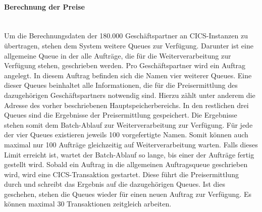 \paragraph{Berechnung der Preise}~\\
Um die Berechnungsdaten der 180.000 Geschäftspartner an CICS-Instanzen zu übertragen, stehen dem System weitere Queues zur Verfügung.
Darunter ist eine allgemeine Queue in der alle Aufträge, die für die Weiterverarbeitung zur Verfügung stehen, geschrieben werden.
Pro Geschäftspartner wird ein Auftrag angelegt.
In diesem Auftrag befinden sich die Namen vier weiterer Queues.
Eine dieser Queues beinhaltet alle Informationen, die für die Preisermittlung des dazugehörigen Geschäftspartners notwendig sind.
Hierzu zählt unter anderem die Adresse des vorher beschriebenen Hauptspeicherbereichs.
In den restlichen drei Queues sind die Ergebnisse der Preisermittlung gespeichert.
Die Ergebnisse stehen somit dem Batch-Ablauf zur Weiterverarbeitung zur Verfügung.
Für jede der vier Queues existieren jeweils 100 vorgefertigte Namen.
Somit können auch maximal nur 100 Aufträge gleichzeitig auf Weiterverarbeitung warten.
Falls dieses Limit erreicht ist, wartet der Batch-Ablauf so lange, bis einer der Aufträge fertig gestellt wird.
Sobald ein Auftrag in die allgemeinen Auftragsqueue geschrieben wird, wird eine CICS-Transaktion gestartet.
Diese führt die Preisermittlung durch und schreibt das Ergebnis auf die dazugehörigen Queues.
Ist dies geschehen, stehen die Queues wieder für einen neuen Auftrag zur Verfügung.
Es können maximal 30 Transaktionen zeitgleich arbeiten.
